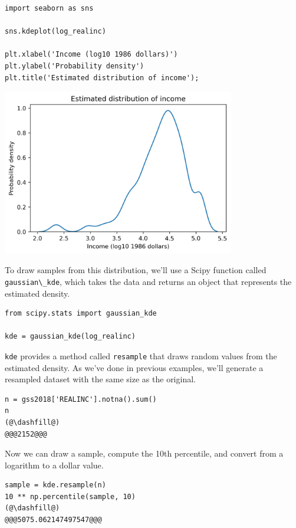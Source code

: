 \begin{lstlisting}[]
import seaborn as sns

sns.kdeplot(log_realinc)

plt.xlabel('Income (log10 1986 dollars)')
plt.ylabel('Probability density')
plt.title('Estimated distribution of income');
\end{lstlisting}

\begin{center}
\includegraphics[width=4in]{chapters/12_bootstrap_files/12_bootstrap_115_0.png}
\end{center}

To draw samples from this distribution, we'll use a Scipy function
called \passthrough{\lstinline!gaussian\_kde!}, which takes the data and
returns an object that represents the estimated density.

\begin{lstlisting}[]
from scipy.stats import gaussian_kde

kde = gaussian_kde(log_realinc)
\end{lstlisting}

\passthrough{\lstinline!kde!} provides a method called
\passthrough{\lstinline!resample!} that draws random values from the
estimated density. As we've done in previous examples, we'll generate a
resampled dataset with the same size as the original.

\begin{lstlisting}[]
n = gss2018['REALINC'].notna().sum()
n
(@\dashfill@)
@@@2152@@@
\end{lstlisting}

Now we can draw a sample, compute the 10th percentile, and convert from
a logarithm to a dollar value.

\begin{lstlisting}[]
sample = kde.resample(n)
10 ** np.percentile(sample, 10)
(@\dashfill@)
@@@5075.062147497547@@@
\end{lstlisting}

